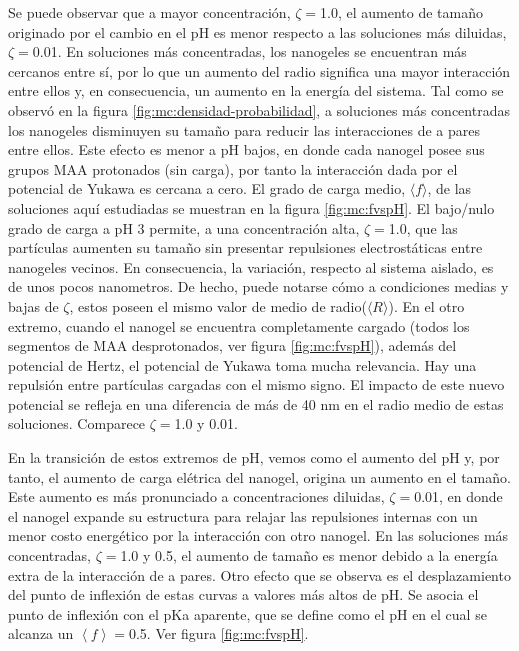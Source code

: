 	Se puede observar que a mayor concentraci\'on, $\zeta = $1.0, el aumento de tama\~no originado por el cambio en el pH es menor respecto a las soluciones m\'as diluidas, $\zeta = $0.01.
	En soluciones m\'as concentradas, los nanogeles se encuentran m\'as cercanos entre s\'i, por lo que un aumento del radio significa una mayor interacci\'on entre ellos y, en consecuencia, un aumento en la energ\'ia del sistema.
	Tal como se observ\'o en la figura \ref{fig:mc:densidad-probabilidad}, a soluciones m\'as concentradas los nanogeles disminuyen su tama\~no para reducir las interacciones de a pares entre ellos. Este efecto es menor a pH bajos, en donde cada nanogel posee sus grupos MAA protonados (sin carga), por tanto la interacción dada por el potencial de Yukawa es cercana a cero. El grado de carga medio, $\langle f \rangle$, de las soluciones aqu\'i estudiadas se muestran en la figura \ref{fig:mc:fvspH}.
	El bajo/nulo grado de carga a pH 3 permite, a una concentraci\'on alta, $\zeta = $1.0, que las part\'iculas aumenten su tama\~no sin presentar repulsiones electrost\'aticas entre nanogeles vecinos. En consecuencia, la variaci\'on, respecto al sistema aislado, es de unos pocos nanometros. De hecho, puede notarse c\'omo a condiciones medias y bajas de $\zeta$, estos poseen el mismo valor de medio de radio($\langle R\rangle$).
	En el otro extremo, cuando el nanogel se encuentra completamente cargado (todos los segmentos de MAA desprotonados, ver figura \ref{fig:mc:fvspH}), adem\'as del potencial de Hertz, el potencial de Yukawa toma mucha relevancia. Hay una repulsi\'on entre part\'iculas cargadas con el mismo signo. El impacto de este nuevo potencial se refleja en una diferencia de m\'as de 40 nm en el radio medio de estas soluciones. Comparece $\zeta = $1.0 y 0.01.
	
	En la transici\'on de estos extremos de pH, vemos como el aumento del pH y, por tanto, el aumento de carga el\'etrica del nanogel, origina un aumento en el tama\~no. Este aumento es m\'as pronunciado a concentraciones diluidas, $\zeta = $0.01, en donde el nanogel expande su estructura para relajar las repulsiones internas con un menor costo energ\'etico por la interacci\'on con otro nanogel. En las soluciones m\'as concentradas, $\zeta = $1.0 y 0.5, el aumento de tama\~no es menor debido a la energ\'ia extra de la interacci\'on de a pares.
	Otro efecto que se observa es el desplazamiento del punto de inflexi\'on de estas curvas a valores m\'as altos de pH.
	Se asocia el punto de inflexi\'on con el pKa aparente, que se define como el pH en el cual se alcanza un $\left< f\right> = $0.5. Ver figura \ref{fig:mc:fvspH}.
	
